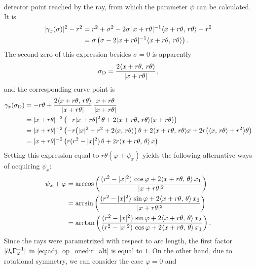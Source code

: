\documentclass{amsart}
\renewcommand*{\phi}{\varphi}
\begin{document}
\begin{example}
 detector point reached by the ray, from which the parameter $\psi$ can be calculated. It is
 \begin{align*}
  |\gamma_x(\sigma)|^2 - r^2 
  &= r^2 + \sigma^2 - 2 \sigma\, |x + r \theta|^{-1} \langle x + r \theta,\,r\theta\rangle - r^2 \\
  &= \sigma \left(\sigma - 2 |x + r \theta|^{-1} \langle x + r \theta,\,r \theta\rangle\right).
 \end{align*}
 The second zero of this expression besides $\sigma=0$ is apparently
 \begin{equation}
  \label{eq:fanbeam_intersec_param}
  \sigma_{\mathrm{D}} = \frac{2 \langle x + r \theta,\,r \theta\rangle}{|x + r \theta|} ,
 \end{equation} 
 and the corresponding curve point is
 \begin{align*}
  \gamma_x(\sigma_{\mathrm{D}}) 
  &= -r \theta + \frac{2 \langle x + r \theta,\,r \theta\rangle}{|x + r \theta|}\, \frac{x + r\theta}{|x + r \theta|} \\
  &= |x + r \theta|^{-2} \left(-r |x + r\theta|^2\, \theta  + 2 \langle x + r \theta,\,r \theta\rangle (x + r\theta)\right) \\
  &= |x + r \theta|^{-2} \left(-r \big(|x|^2 + r^2 + 2\langle x,\,r\theta\rangle\big)\, \theta  +
  2 \langle x + r \theta,\,r \theta\rangle x + 2r \big(\langle x,\,r \theta\rangle + r^2\big)\theta \right) \\
  &= |x + r\theta|^{-2} \left(r(r^2 - |x|^2)\, \theta + 2r \langle x + r\theta,\,\theta\rangle\, x \right)
 \end{align*}
 Setting this expression equal to $r\theta(\phi + \psi_x)$ yields the following alternative ways of acquiring $\psi_x$:
 \begin{align}
  \psi_x + \phi
  \label{eq:fanbeam_psi_1}
  &= \arccos\left(\frac{(r^2 - \ABS{x}^2)\, \cos\phi + 2 \INNER{x + r\theta}{\theta}\, x_1}{\ABS{x + r\theta}^2} \right) \\
  \label{eq:fanbeam_psi_2}
  &= \arcsin\left(\frac{(r^2 - \ABS{x}^2)\, \sin\phi + 2 \INNER{x + r\theta}{\theta}\, x_2}{\ABS{x + r\theta}^2} \right) \\
  \label{eq:fanbeam_psi_3}
  &= \arctan\left(\frac{(r^2 - \ABS{x}^2)\, \sin\phi + 2 \INNER{x + r\theta}{\theta}\, x_2}{
  (r^2 - \ABS{x}^2)\, \cos\phi + 2 \INNER{x + r\theta}{\theta}\, x_1} \right).
 \end{align}
 Since the rays were parametrized with respect to arc length, the first factor $\ABS{\partial_s\Gamma_\phi^{-1}}$ in 
 \eqref{eq:adj_op_onedir_alt} is equal to $1$. On the other hand, due to rotational symmetry, we can consider the case $\phi=0$ and 

\end{example}
\end{document}
